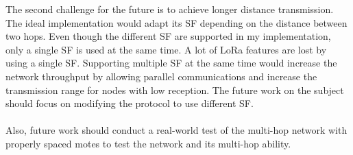 \documentclass[11pt]{report}
\begin{document}
The second challenge for the future is to achieve longer distance transmission.
The ideal implementation would adapt its SF depending on the distance between two hops.
Even though the different SF are supported in my implementation, only a single SF is used at the same time.
A lot of LoRa features are lost by using a single SF.
Supporting multiple SF at the same time would increase the network throughput by
allowing parallel communications and increase the transmission range for nodes
with low reception.
The future work on the subject should focus on modifying the protocol to use
different SF.

\paragraph{}

Also, future work should conduct a real-world test of the multi-hop network
with properly spaced motes to test the network and its multi-hop ability.

\newpage

\printbibliography

\newpage

\begin{appendices}

\end{appendices}
\end{document}
